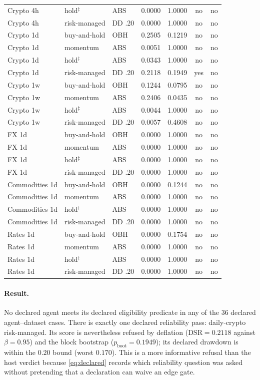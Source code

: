 \begin{table}[t]
\begin{tabular}{lllrrcc}
Crypto 4h & hold$^{\ddagger}$ & ABS & 0.0000 & 1.0000 & no & no \\
Crypto 4h & risk-managed & DD .20 & 0.0000 & 1.0000 & no & no \\
Crypto 1d & buy-and-hold & OBH & 0.2505 & 0.1219 & no & no \\
Crypto 1d & momentum & ABS & 0.0051 & 1.0000 & no & no \\
Crypto 1d & hold$^{\ddagger}$ & ABS & 0.0343 & 1.0000 & no & no \\
Crypto 1d & risk-managed & DD .20 & 0.2118 & 0.1949 & yes & no \\
Crypto 1w & buy-and-hold & OBH & 0.1244 & 0.0795 & no & no \\
Crypto 1w & momentum & ABS & 0.2406 & 0.0435 & no & no \\
Crypto 1w & hold$^{\ddagger}$ & ABS & 0.0044 & 1.0000 & no & no \\
Crypto 1w & risk-managed & DD .20 & 0.0057 & 0.4608 & no & no \\
FX 1d & buy-and-hold & OBH & 0.0000 & 1.0000 & no & no \\
FX 1d & momentum & ABS & 0.0000 & 1.0000 & no & no \\
FX 1d & hold$^{\ddagger}$ & ABS & 0.0000 & 1.0000 & no & no \\
FX 1d & risk-managed & DD .20 & 0.0000 & 1.0000 & no & no \\
Commodities 1d & buy-and-hold & OBH & 0.0000 & 0.1244 & no & no \\
Commodities 1d & momentum & ABS & 0.0000 & 1.0000 & no & no \\
Commodities 1d & hold$^{\ddagger}$ & ABS & 0.0000 & 1.0000 & no & no \\
Commodities 1d & risk-managed & DD .20 & 0.0000 & 1.0000 & no & no \\
Rates 1d & buy-and-hold & OBH & 0.0000 & 0.1754 & no & no \\
Rates 1d & momentum & ABS & 0.0000 & 1.0000 & no & no \\
Rates 1d & hold$^{\ddagger}$ & ABS & 0.0000 & 1.0000 & no & no \\
Rates 1d & risk-managed & DD .20 & 0.0000 & 1.0000 & no & no \\
\bottomrule
\end{tabular}
\end{table}

\paragraph{Result.} No declared agent meets its declared eligibility predicate in any of the 36 declared agent--dataset cases. There is exactly one declared reliability pass: daily-crypto risk-managed. Its score is nevertheless refused by deflation ($\text{DSR}=0.2118$ against $\beta=0.95$) and the block bootstrap ($p_{\text{boot}}=0.1949$); its declared drawdown is within the $0.20$ bound (worst $0.170$). This is a more informative refusal than the host verdict because \cref{eq:declared} records which reliability question was asked without pretending that a declaration can waive an edge gate.

